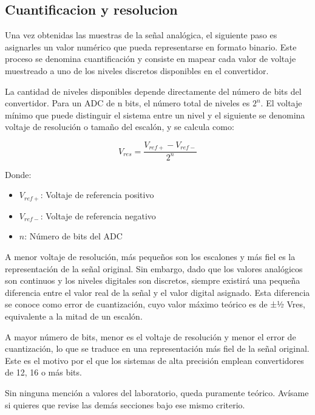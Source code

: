 \documentclass[12pt,letterpaper]{article}
\begin{document}
    \subsection{Cuantificacion y resolucion }
    Una vez obtenidas las muestras de la señal analógica, el siguiente paso es asignarles un valor numérico que pueda representarse en formato binario. Este proceso se denomina cuantificación y consiste en mapear cada valor de voltaje muestreado a uno de los niveles discretos disponibles en el convertidor.

    La cantidad de niveles disponibles depende directamente del número de bits del convertidor. Para un ADC de n bits, el número total de niveles es $2^n$. El voltaje mínimo que puede distinguir el sistema entre un nivel y el siguiente se denomina voltaje de resolución o tamaño del escalón, y se calcula como:
    
    \begin{equation}
        V_{res} = \frac{V_{ref+} - V_{ref-}}{2^n}
        \label{Eq:Vres}
    \end{equation}

    Donde:
    
    \begin{itemize}
        \item $V_{ref+}$: Voltaje de referencia positivo
        \item $V_{ref-}$: Voltaje de referencia negativo
        \item $n$: Número de bits del ADC
    \end{itemize}
    
    A menor voltaje de resolución, más pequeños son los escalones y más fiel es la representación de la señal original. Sin embargo, dado que los valores analógicos son continuos y los niveles digitales son discretos, siempre existirá una pequeña diferencia entre el valor real de la señal y el valor digital asignado. Esta diferencia se conoce como error de cuantización, cuyo valor máximo teórico es de ±½ Vres, equivalente a la mitad de un escalón.

    A mayor número de bits, menor es el voltaje de resolución y menor el error de cuantización, lo que se traduce en una representación más fiel de la señal original. Este es el motivo por el que los sistemas de alta precisión emplean convertidores de 12, 16 o más bits.

    Sin ninguna mención a valores del laboratorio, queda puramente teórico. Avísame si quieres que revise las demás secciones bajo ese mismo criterio.
\end{document}
